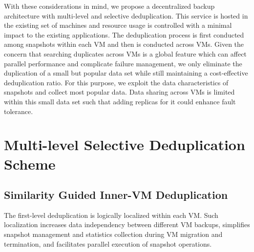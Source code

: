 With these considerations in mind, we propose a decentralized backup architecture with multi-level and selective 
deduplication. This service is hosted   in the existing set of machines and resource usage is controlled
with a minimal impact to the existing applications.
The deduplication process is first conducted among snapshots within each VM
and then is conducted across VMs.  
Given the concern that searching duplicates across VMs is a global feature which can affect parallel performance
and complicate failure management,
we only eliminate the duplication of a small but popular data set while still maintaining a cost-effective deduplication ratio.
For this purpose, we exploit the data characteristics of snapshots and collect most popular data.
Data sharing across VMs is limited within this small data set such that adding replicas for it could enhance fault tolerance.

\section{Multi-level Selective Deduplication Scheme}
\label{inline:dedup}
\subsection{Similarity Guided Inner-VM Deduplication}
\label{sect:innerVM}
The first-level deduplication is logically localized within each VM.
Such localization increases data independency between different  VM backups,
simplifies  snapshot  management and statistics collection during VM migration and termination,
and facilitates parallel execution of snapshot operations.


